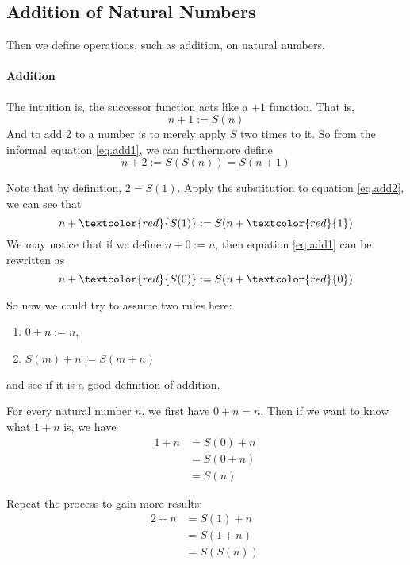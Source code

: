 \subsection{Addition of Natural Numbers}
Then we define operations, such as addition, on natural numbers. 

\paragraph{Addition}
The intuition is, the successor function acts like a $+1$ function. That is, 
\begin{equation}
n+1 := S(n) \label{eq.add1}
\end{equation}
And to add 2 to a number is to merely apply $S$ two times to it. So from the informal equation 
\ref{eq.add1}, we can furthermore define 
\begin{equation}
n+2 := S(S(n)) = S(n+1) \label{eq.add2}
\end{equation}

Note that by definition, $2=S(1)$. Apply the substitution to equation \ref{eq.add2}, we can see that 
\[
n + \textcolor{red}{S(1)} := S(n+\textcolor{red}{1})
\] We may notice that if we define $n+0 := n$, then equation \ref{eq.add1} can be rewritten as 
\[
n + \textcolor{red}{S(0)} := S(n+\textcolor{red}{0})
\]

So now we could try to assume two rules here:
\begin{definition}
\begin{enumerate}
\item $0+n:=n$,
\item $S(m)+n:=S(m+n)$
\end{enumerate}
\end{definition} and see if it is a good definition of addition.

For every natural number $n$, we first have $0+n=n$. Then if we want to know what $1+n$ is, we have
\begin{align*}
1+n 
&= S(0)+n\ \tag{By Def.~of 1} \\
&= S(0+n)\ \tag{By the second rule} \\
&= S(n)\ \tag{By the first rule}
\end{align*}

Repeat the process to gain more results:
\begin{align*}
2+n 
&= S(1)+n\ \tag{By Def.~of 2} \\
&= S(1+n)\ \tag{By the second rule} \\
&= S(S(n))\ \tag{By the result of \(1+n\)}
\end{align*}

